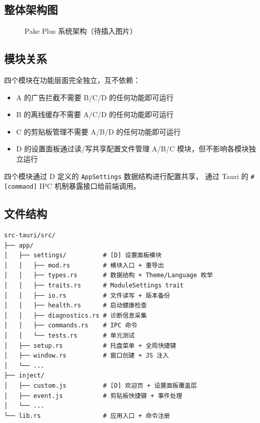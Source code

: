 \documentclass[12pt,a4paper]{ctexart}
\begin{document}
\subsection{整体架构图}

\begin{figure}[h]
\centering
\caption{Pake Plus 系统架构（待插入图片）}
\end{figure}

\subsection{模块关系}

四个模块在功能层面完全独立，互不依赖：

\begin{itemize}
  \item A 的广告拦截不需要 B/C/D 的任何功能即可运行
  \item B 的离线缓存不需要 A/C/D 的任何功能即可运行
  \item C 的剪贴板管理不需要 A/B/D 的任何功能即可运行
  \item D 的设置面板通过读/写共享配置文件管理 A/B/C 模块，但不影响各模块独立运行
\end{itemize}

四个模块通过 D 定义的 \texttt{AppSettings} 数据结构进行配置共享，
通过 Tauri 的 \texttt{\#[command]} IPC 机制暴露接口给前端调用。

\subsection{文件结构}

\begin{lstlisting}[caption=Pake Plus 代码结构]
src-tauri/src/
├── app/
│   ├── settings/          # [D] 设置面板模块
│   │   ├── mod.rs         # 模块入口 + 重导出
│   │   ├── types.rs       # 数据结构 + Theme/Language 枚举
│   │   ├── traits.rs      # ModuleSettings trait
│   │   ├── io.rs          # 文件读写 + 版本备份
│   │   ├── health.rs      # 启动健康检查
│   │   ├── diagnostics.rs # 诊断信息采集
│   │   ├── commands.rs    # IPC 命令
│   │   └── tests.rs       # 单元测试
│   ├── setup.rs           # 托盘菜单 + 全局快捷键
│   ├── window.rs          # 窗口创建 + JS 注入
│   └── ...
├── inject/
│   ├── custom.js          # [D] 欢迎页 + 设置面板覆盖层
│   ├── event.js           # 剪贴板快捷键 + 事件处理
│   └── ...
└── lib.rs                 # 应用入口 + 命令注册
\end{lstlisting}
\end{document}
